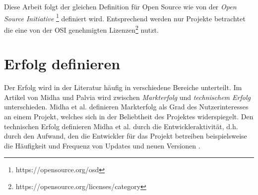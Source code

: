 Diese Arbeit folgt der gleichen Definition für Open Source wie von der \textit{Open Source Initiative
}\footnote{https://opensource.org/osd} definiert wird. Entsprechend werden nur Projekte betrachtet 
die eine von der OSI genehmigten Lizenzen\footnote{https://opensource.org/licenses/category} nutzt.




\bigskip




\section{Erfolg definieren}


Der Erfolg wird in der Literatur häufig in verschiedene Bereiche unterteilt.
Im Artikel von Midha und Palvia wird zwischen \textit{Markterfolg} und \textit{technischem Erfolg}
unterschieden.
Midha et al. definieren Markterfolg
als Grad des Nutzerinteresses an einem Projekt, %
welches sich in der Beliebtheit des Projektes widerspiegelt.
Den technischen Erfolg definieren Midha et al. durch die Entwickleraktivität, d.h. durch den Aufwand,
den die Entwickler für das Projekt betreiben %
beispielsweise die Häufigkeit und Frequenz von Updates und neuen Versionen
\cite{midhaFactorsAffectingSuccess2012}. %


